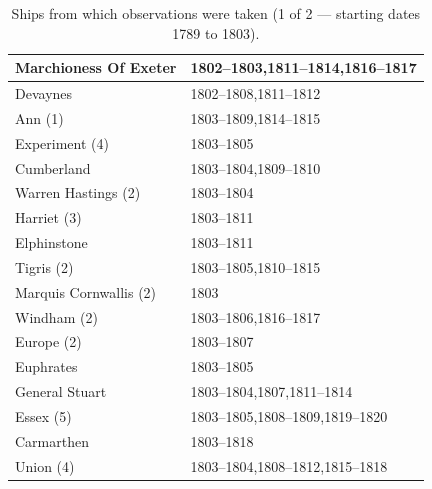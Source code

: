 \documentclass[CP]{copernicus}
\begin{document}
\begin{table}[!hbp]
\begin{minipage}[b]{0.5\linewidth}
{\begin{tabular}{|p{3.5cm}|p{3.5cm}|}
\hline
Marchioness Of Exeter & 1802--1803,1811--1814,1816--1817\\
\hline
Devaynes & 1802--1808,1811--1812\\
\hline
Ann (1) & 1803--1809,1814--1815\\
\hline
Experiment (4) & 1803--1805\\
\hline
Cumberland & 1803--1804,1809--1810\\
\hline
Warren Hastings (2) & 1803--1804\\
\hline
Harriet (3) & 1803--1811\\
\hline
Elphinstone & 1803--1811\\
\hline
Tigris (2) & 1803--1805,1810--1815\\
\hline
Marquis Cornwallis (2) & 1803\\
\hline
Windham (2) & 1803--1806,1816--1817\\
\hline
Europe (2) & 1803--1807\\
\hline
Euphrates & 1803--1805\\
\hline
General Stuart & 1803--1804,1807,1811--1814\\
\hline
Essex (5) & 1803--1805,1808--1809,1819--1820\\
\hline
Carmarthen & 1803--1818\\
\hline
Union (4) & 1803--1804,1808--1812,1815--1818\\
\hline
\end{tabular}
}
\end{minipage}
\vspace{0.5cm}
\caption{Ships from which observations were taken (1 of 2 --- starting dates 1789 to 1803).}
\label{T1.1}
\end{table}
\end{document}
